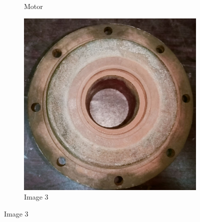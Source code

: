 \documentclass[12pt]{article}
\begin{document}
\begin{figure}[h]
\begin{subfigure}{0.3\textwidth}
        \caption{Motor}
    \end{subfigure}
    \hfill
    \begin{subfigure}{0.3\textwidth}
        \includegraphics[width=\linewidth]{img/p_03.jpg}
        \caption{Image 3}
    \end{subfigure}
  
    \vspace{0.5cm}
  

\end{figure}
\end{document}
